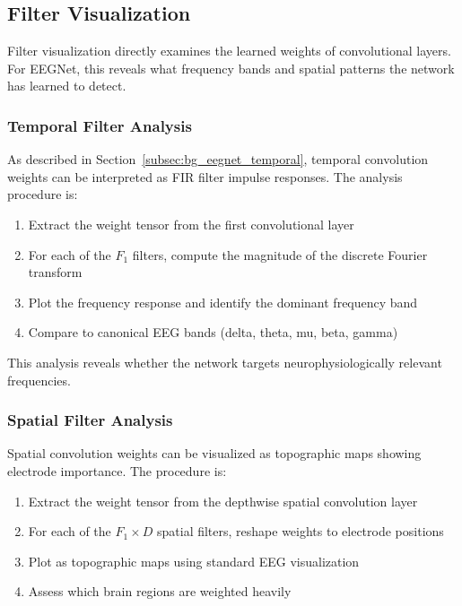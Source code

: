 \subsection{Filter Visualization}
\label{subsec:bg_filter_viz}

Filter visualization directly examines the learned weights of convolutional layers. For EEGNet, this reveals what frequency bands and spatial patterns the network has learned to detect.

\subsubsection{Temporal Filter Analysis}

As described in Section~\ref{subsec:bg_eegnet_temporal}, temporal convolution weights can be interpreted as FIR filter impulse responses. The analysis procedure is:

\begin{enumerate}
    \item Extract the weight tensor from the first convolutional layer
    \item For each of the $F_1$ filters, compute the magnitude of the discrete Fourier transform
    \item Plot the frequency response and identify the dominant frequency band
    \item Compare to canonical EEG bands (delta, theta, mu, beta, gamma)
\end{enumerate}

This analysis reveals whether the network targets neurophysiologically relevant frequencies.

\subsubsection{Spatial Filter Analysis}

Spatial convolution weights can be visualized as topographic maps showing electrode importance. The procedure is:

\begin{enumerate}
    \item Extract the weight tensor from the depthwise spatial convolution layer
    \item For each of the $F_1 \times D$ spatial filters, reshape weights to electrode positions
    \item Plot as topographic maps using standard EEG visualization
    \item Assess which brain regions are weighted heavily
\end{enumerate}


